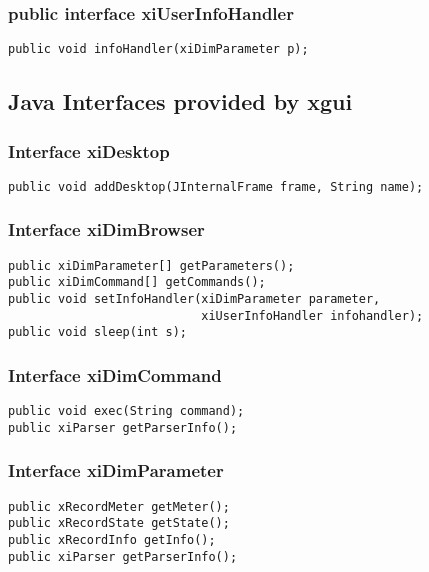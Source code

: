 \subsubsection{public interface xiUserInfoHandler}
{\tt public void infoHandler(xiDimParameter p);}

\subsection{Java Interfaces provided by xgui}
\subsubsection{Interface xiDesktop}
{\tt public void addDesktop(JInternalFrame frame, String name);}

\subsubsection{Interface xiDimBrowser}
\begin{verbatim}
public xiDimParameter[] getParameters();
public xiDimCommand[] getCommands();
public void setInfoHandler(xiDimParameter parameter, 
                           xiUserInfoHandler infohandler);
public void sleep(int s);
\end{verbatim}

\subsubsection{Interface xiDimCommand}
\begin{verbatim}
public void exec(String command);
public xiParser getParserInfo();
\end{verbatim}

\subsubsection{Interface xiDimParameter}
\begin{verbatim}
public xRecordMeter getMeter();
public xRecordState getState();
public xRecordInfo getInfo();
public xiParser getParserInfo();
\end{verbatim}

